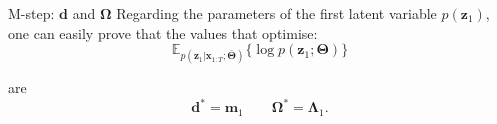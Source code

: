 \documentclass{beamer}
\newcommand{\bs}[1]{\boldsymbol{#1}}
\begin{document}

\begin{frame}{M-step: $\bs{d}$ and $\bs{\Omega}$}
 Regarding the parameters of the first latent variable $p(\bs{z}_1)$, one can easily prove that the values that optimise:
 \begin{equation*}
  \mathbb{E}_{p(\bs{z}_{1}|\bs{x}_{1:T};\bar{\bs{\Theta}})}\{\log p(\bs{z}_1;\bs{\Theta}) \}
 \end{equation*}
 
 are
 \begin{equation*}
  \bs{d}^* = \bs{m}_1 \qquad \bs{\Omega}^* = \bs{\Lambda}_1.
 \end{equation*}
\end{frame}
\end{document}
